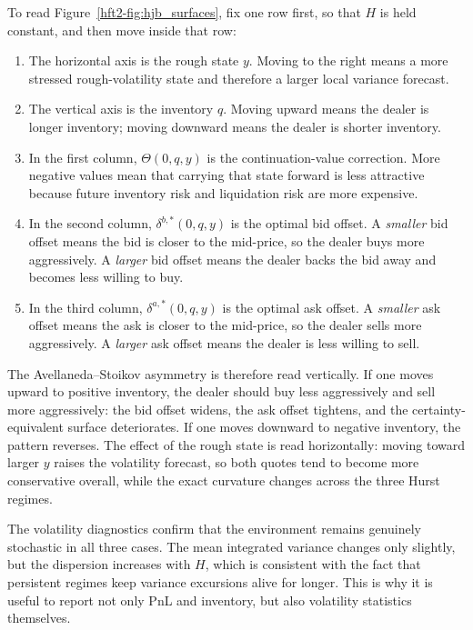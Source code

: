 To read Figure~\ref{hft2-fig:hjb_surfaces}, fix one row first, so that \(H\) is held constant, and then move inside that row:
\begin{enumerate}[label=\arabic*.]
    \item The horizontal axis is the rough state \(y\). Moving to the right means a more stressed rough-volatility state and therefore a larger local variance forecast.
    \item The vertical axis is the inventory \(q\). Moving upward means the dealer is longer inventory; moving downward means the dealer is shorter inventory.
    \item In the first column, \(\Theta(0,q,y)\) is the continuation-value correction. More negative values mean that carrying that state forward is less attractive because future inventory risk and liquidation risk are more expensive.
    \item In the second column, \(\delta^{b,*}(0,q,y)\) is the optimal bid offset. A \emph{smaller} bid offset means the bid is closer to the mid-price, so the dealer buys more aggressively. A \emph{larger} bid offset means the dealer backs the bid away and becomes less willing to buy.
    \item In the third column, \(\delta^{a,*}(0,q,y)\) is the optimal ask offset. A \emph{smaller} ask offset means the ask is closer to the mid-price, so the dealer sells more aggressively. A \emph{larger} ask offset means the dealer is less willing to sell.
\end{enumerate}

The Avellaneda--Stoikov asymmetry is therefore read vertically. If one moves upward to positive inventory, the dealer should buy less aggressively and sell more aggressively: the bid offset widens, the ask offset tightens, and the certainty-equivalent surface deteriorates. If one moves downward to negative inventory, the pattern reverses. The effect of the rough state is read horizontally: moving toward larger \(y\) raises the volatility forecast, so both quotes tend to become more conservative overall, while the exact curvature changes across the three Hurst regimes.

The volatility diagnostics confirm that the environment remains genuinely stochastic in all three cases. The mean integrated variance changes only slightly, but the dispersion increases with \(H\), which is consistent with the fact that persistent regimes keep variance excursions alive for longer. This is why it is useful to report not only PnL and inventory, but also volatility statistics themselves.

